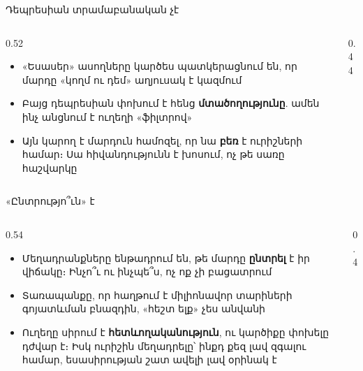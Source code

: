 \begin{frame}{Դեպրեսիան տրամաբանական չէ}
  \begin{columns}[c]
    \begin{column}{0.52\textwidth}
      \begin{itemize}
        \item «Եսասեր» ասողները կարծես պատկերացնում են, որ մարդը «կողմ ու դեմ» աղյուսակ է կազմում
        \item Բայց դեպրեսիան փոխում է հենց \textbf{մտածողությունը}. ամեն ինչ անցնում է ուղեղի «ֆիլտրով»
        \item<3-> Այն կարող է մարդուն համոզել, որ նա \textbf{բեռ} է ուրիշների համար։ Սա հիվանդությունն է խոսում, ոչ թե սառը հաշվարկը
      \end{itemize}
    \end{column}
    \begin{column}{0.44\textwidth}
    \end{column}
  \end{columns}
\end{frame}

\begin{frame}{«Ընտրությո՞ւն» է}
  \begin{columns}[c]
    \begin{column}{0.54\textwidth}
      \begin{itemize}
        \item Մեղադրանքները ենթադրում են, թե մարդը \textbf{ընտրել} է իր վիճակը։ Ինչո՞ւ ու ինչպե՞ս, ոչ ոք չի բացատրում
        \item Տառապանքը, որ հաղթում է միլիոնավոր տարիների գոյատևման բնազդին, «հեշտ ելք» չես անվանի
        \item<2-> Ուղեղը սիրում է \textbf{հետևողականություն}, ու կարծիքը փոխելը դժվար է։ Իսկ ուրիշին մեղադրելը՝ ինքդ քեզ լավ զգալու համար, եսասիրության շատ ավելի լավ օրինակ է
      \end{itemize}
    \end{column}
    \begin{column}{0.4\textwidth}
    \end{column}
  \end{columns}
\end{frame}
